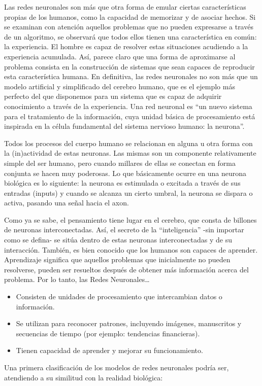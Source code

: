     Las redes neuronales son más que otra forma de emular ciertas características propias de los humanos, como la capacidad de memorizar y de asociar hechos. Si se examinan con atención aquellos problemas que no pueden expresarse a través de un algoritmo, se observará que todos ellos tienen una característica en común: la experiencia. El hombre es capaz de resolver estas situaciones acudiendo a la experiencia acumulada. Así, parece claro que una forma de aproximarse al problema consista en la construcción de sistemas que sean capaces de reproducir esta característica humana. En definitiva, las redes neuronales no son más que un modelo artificial y simplificado del cerebro humano, que es el ejemplo más perfecto del que disponemos para un sistema que es capaz de adquirir conocimiento a través de la experiencia. Una red neuronal es “un nuevo sistema para el tratamiento de la información, cuya unidad básica de procesamiento está inspirada en la célula fundamental del sistema nervioso humano: la neurona”.\\
    \newline
    
    Todos los procesos del cuerpo humano se relacionan en alguna u otra forma con la (in)actividad de estas neuronas. Las mismas son un componente relativamente simple del ser humano, pero cuando millares de ellas se conectan en forma conjunta se hacen muy poderosas. Lo que básicamente ocurre en una neurona biológica es lo siguiente: la neurona es estimulada o excitada a través de sus entradas (inputs) y cuando se alcanza un cierto umbral, la neurona se dispara o activa, pasando una señal hacia el axon.\\
    \newline
    
    Como ya se sabe, el pensamiento tiene lugar en el cerebro, que consta de billones de neuronas interconectadas. Así, el secreto de la “inteligencia” -sin importar como se defina- se sitúa dentro de estas neuronas interconectadas y de su interacción. También, es bien conocido que los humanos son capaces de aprender. Aprendizaje significa que aquellos problemas que inicialmente no pueden resolverse, pueden ser resueltos después de obtener más información acerca del problema. Por lo tanto, las Redes Neuronales…
    \begin{itemize}
        \item Consisten de unidades de procesamiento que intercambian datos o información. 
        \item Se utilizan para reconocer patrones, incluyendo imágenes, manuscritos y secuencias de tiempo (por ejemplo: tendencias financieras).
        \item Tienen capacidad de aprender y mejorar su funcionamiento.
    \end{itemize}
    Una primera clasificación de los modelos de redes neuronales podría ser,
    atendiendo a su similitud con la realidad biológica:
    
